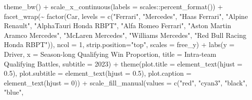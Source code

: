 \documentclass[
]{book}
\newenvironment{Shaded}{\begin{snugshade}}{\end{snugshade}}
\newcommand{\AttributeTok}[1]{\textcolor[rgb]{0.77,0.63,0.00}{#1}}
\newcommand{\DecValTok}[1]{\textcolor[rgb]{0.00,0.00,0.81}{#1}}
\newcommand{\FloatTok}[1]{\textcolor[rgb]{0.00,0.00,0.81}{#1}}
\newcommand{\FunctionTok}[1]{\textcolor[rgb]{0.00,0.00,0.00}{#1}}
\newcommand{\NormalTok}[1]{#1}
\newcommand{\SpecialCharTok}[1]{\textcolor[rgb]{0.00,0.00,0.00}{#1}}
\newcommand{\StringTok}[1]{\textcolor[rgb]{0.31,0.60,0.02}{#1}}
\begin{document}
\begin{Shaded}
\begin{Highlighting}[]
  \FunctionTok{theme\_bw}\NormalTok{() }\SpecialCharTok{+}
  \FunctionTok{scale\_x\_continuous}\NormalTok{(}\AttributeTok{labels =}\NormalTok{ scales}\SpecialCharTok{::}\FunctionTok{percent\_format}\NormalTok{()) }\SpecialCharTok{+}
  \FunctionTok{facet\_wrap}\NormalTok{(}\SpecialCharTok{\textasciitilde{}} \FunctionTok{factor}\NormalTok{(Car,}
                      \AttributeTok{levels =} \FunctionTok{c}\NormalTok{(}\StringTok{"Ferrari"}\NormalTok{,}
                                 \StringTok{"Mercedes"}\NormalTok{,}
                                 \StringTok{"Haas Ferrari"}\NormalTok{,}
                                 \StringTok{"Alpine Renault"}\NormalTok{,}
                                 \StringTok{"AlphaTauri Honda RBPT"}\NormalTok{,}
                                 \StringTok{"Alfa Romeo Ferrari"}\NormalTok{, }
                                 \StringTok{"Aston Martin Aramco Mercedes"}\NormalTok{,}
                                 \StringTok{"McLaren Mercedes"}\NormalTok{,}
                                 \StringTok{"Williams Mercedes"}\NormalTok{,}
                                 \StringTok{"Red Bull Racing Honda RBPT"}\NormalTok{)),}
                      \AttributeTok{ncol =} \DecValTok{1}\NormalTok{, }\AttributeTok{strip.position=}\StringTok{"top"}\NormalTok{, }\AttributeTok{scales =} \StringTok{\textquotesingle{}free\_y\textquotesingle{}}\NormalTok{) }\SpecialCharTok{+}
  \FunctionTok{labs}\NormalTok{(}\AttributeTok{y =} \StringTok{\textquotesingle{}Driver\textquotesingle{}}\NormalTok{,}
       \AttributeTok{x =} \StringTok{\textquotesingle{}Season{-}long Qualifying Win Proportion\textquotesingle{}}\NormalTok{,}
       \AttributeTok{title =} \StringTok{\textquotesingle{}Intra{-}team Qualifying Battles\textquotesingle{}}\NormalTok{,}
       \AttributeTok{subtitle =} \StringTok{\textquotesingle{}2023\textquotesingle{}}\NormalTok{) }\SpecialCharTok{+}
  \FunctionTok{theme}\NormalTok{(}\AttributeTok{plot.title =} \FunctionTok{element\_text}\NormalTok{(}\AttributeTok{hjust =} \FloatTok{0.5}\NormalTok{),}
        \AttributeTok{plot.subtitle =} \FunctionTok{element\_text}\NormalTok{(}\AttributeTok{hjust =} \FloatTok{0.5}\NormalTok{),}
        \AttributeTok{plot.caption =} \FunctionTok{element\_text}\NormalTok{(}\AttributeTok{hjust =} \DecValTok{0}\NormalTok{)) }\SpecialCharTok{+}
  \FunctionTok{scale\_fill\_manual}\NormalTok{(}\AttributeTok{values =} \FunctionTok{c}\NormalTok{(}\StringTok{"red"}\NormalTok{, }
                                \StringTok{"cyan3"}\NormalTok{,  }
                                \StringTok{"black"}\NormalTok{, }
                                \StringTok{"blue"}\NormalTok{,}

\end{Highlighting}
\end{Shaded}
\end{document}
